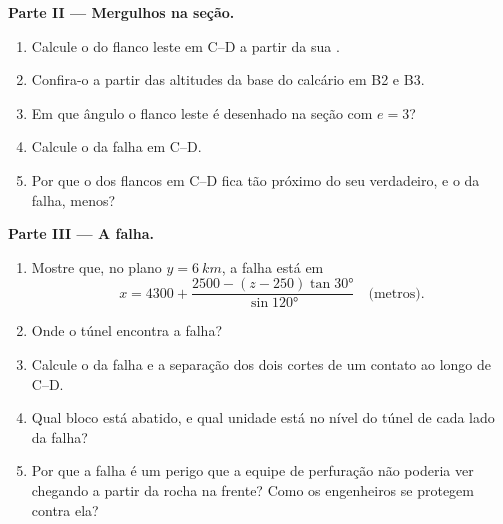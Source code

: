 \begin{problem}
\medskip
\noindent\textbf{Parte II --- Mergulhos na seção.}
\begin{enumerate}[resume]
  \item Calcule o  do flanco leste em C--D a partir da sua .
  \item Confira-o a partir das altitudes da base do calcário em B2 e B3.
  \item Em que ângulo o flanco leste é desenhado na seção com $e = 3$?
  \item Calcule o  da falha em C--D.
  \item Por que o  dos flancos em C--D fica tão próximo do seu  verdadeiro, e o da falha, menos?
\end{enumerate}

\medskip
\noindent\textbf{Parte III --- A falha.}
\begin{enumerate}[resume]
  \item Mostre que, no plano $y = \qty{6}{km}$, a falha está em
        \[ x = 4300 + \frac{2500 - (z - 250)\tan\ang{30}}{\sin\ang{120}}
           \quad\text{(metros)}. \]
  \item Onde o túnel encontra a falha?
  \item Calcule o  da falha e a separação dos dois cortes de um contato ao longo de C--D.
  \item Qual bloco está abatido, e qual unidade está no nível do túnel de cada lado da falha?
  \item Por que a falha é um perigo que a equipe de perfuração não poderia ver chegando a partir da rocha na frente? Como os engenheiros se protegem contra ela?
\end{enumerate}


\end{problem}
